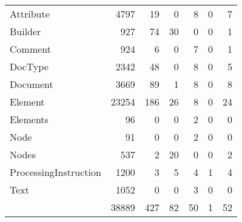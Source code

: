 \begin{tabular}{|l|r|r|r||r|r|r|}\hline
\typeHeading				& \successHeading & \failureHeading &\errorHeading &\successOnlyHeading	& \nonSuccessOnlyHeading 	& \mixedHeading\\\hline\hline
Attribute		& 4797	& 19	& 0	& 8	& 0	& 7\\\hline
Builder		& 927	& 74	& 30	& 0	& 0	& 1\\\hline
Comment		& 924	& 6	& 0	& 7	& 0	& 1\\\hline
DocType		& 2342	& 48	& 0	& 8	& 0	& 5\\\hline
Document		& 3669	& 89	& 1	& 8	& 0	& 8\\\hline
Element		& 23254	& 186	& 26	& 8	& 0	& 24\\\hline
Elements		& 96	& 0	& 0	& 2	& 0	& 0\\\hline
Node		& 91	& 0	& 0	& 2	& 0	& 0\\\hline
Nodes		& 537	& 2	& 20	& 0	& 0	& 2\\\hline
ProcessingInstruction		& 1200	& 3	& 5	& 4	& 1	& 4\\\hline
Text		& 1052	& 0	& 0	& 3	& 0	& 0\\\hline
\hline
 & 38889 & 427 & 82 & 50 & 1 & 52\\\hline
\end{tabular}
